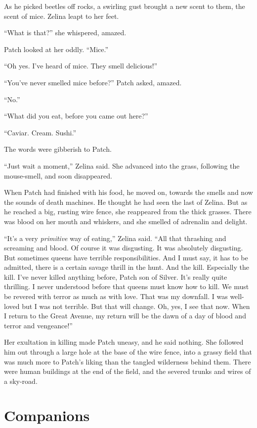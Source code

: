 \documentclass[12pt]{memoir}
\begin{document}
As he picked beetles off rocks, a swirling gust brought a new scent to
them, the scent of mice. Zelina leapt to her feet.

“What is that?” she whispered, amazed.

Patch looked at her oddly. “Mice.”

“Oh yes. I’ve heard of mice. They smell delicious!”

“You’ve never smelled mice before?” Patch asked, amazed.

“No.”

“What did you eat, before you came out here?”

“Caviar. Cream. Sushi.”

The words were gibberish to Patch.

“Just wait a moment,” Zelina said. She advanced into the grass,
following the mouse-smell, and soon disappeared.

When Patch had finished with his food, he moved on, towards the smells
and now the sounds of death machines. He thought he had seen the last
of Zelina. But as he reached a big, rusting wire fence, she reappeared
from the thick grasses. There was blood on her mouth and whiskers, and
she smelled of adrenalin and delight.

“It’s a very \textit{primitive} way of eating,” Zelina said. “All that
thrashing and screaming and blood. Of course it was disgusting. It was
absolutely disgusting. But sometimes queens have terrible
responsibilities. And I must say, it has to be admitted, there is a
certain savage thrill in the hunt. And the kill. Especially the
kill. I’ve never killed anything before, Patch son of Silver. It’s
really quite thrilling. I never understood before that queens must
know how to kill. We must be revered with terror as much as with
love. That was my downfall. I was well-loved but I was not
terrible. But that will change. Oh, yes, I see that now. When I return
to the Great Avenue, my return will be the dawn of a day of blood and
terror and vengeance!”

Her exultation in killing made Patch uneasy, and he said nothing. She
followed him out through a large hole at the base of the wire fence,
into a grassy field that was much more to Patch’s liking than the
tangled wilderness behind them. There were human buildings at the end
of the field, and the severed trunks and wires of a sky-road.


\section{Companions}
\end{document}
